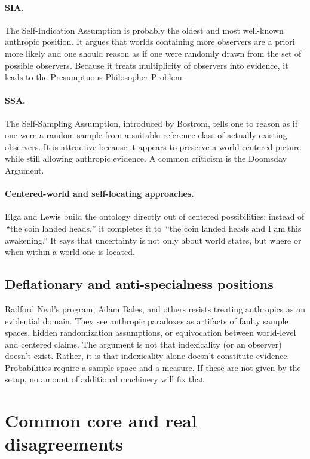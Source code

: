 \documentclass[11pt]{article}
\newcommand{\1}{\mathbf{1}}
\begin{document}
\paragraph{SIA.} The Self-Indication Assumption is probably the oldest and most well-known anthropic position. 
It argues that worlds containing more observers are a priori more likely and one should reason as if one were randomly drawn from the set of possible observers. 
Because it treats multiplicity of observers into evidence, it leads to the Presumptuous Philosopher Problem.

\paragraph{SSA.} The Self-Sampling Assumption, introduced by Bostrom, tells one to reason as if one were a random sample from a suitable reference class of actually existing observers. 
It is attractive because it appears to preserve a world-centered picture while still allowing anthropic evidence. A common criticism is the Doomsday Argument.

\paragraph{Centered-world and self-locating approaches.} Elga and Lewis build the ontology directly out of centered possibilities: 
instead of \,``the coin landed heads,'' it completes it to \,``the coin landed heads and I am this awakening.'' 
It says that uncertainty is not only about world states, but where or when within a world one is located. 

\subsection{Deflationary and anti-specialness positions}

Radford Neal's program, Adam Bales, and others resists treating anthropics as an evidential domain. 
They see anthropic paradoxes as artifacts of faulty sample spaces, hidden randomization assumptions, or equivocation between world-level and centered claims. 
The argument is not that indexicality (or an observer) doesn't exist. Rather, it is that indexicality alone doesn't constitute evidence.
Probabilities require a sample space and a measure. If these are not given by the setup, no amount of additional machinery will fix that.


\section{Common core and real disagreements}
\end{document}
